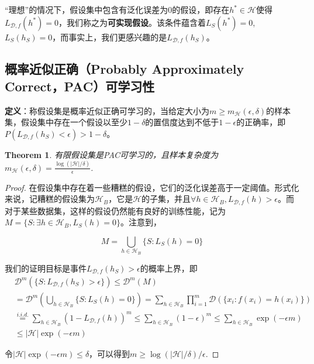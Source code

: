 \documentclass{article}
\newtheorem{theorem}{Theorem}
\newtheorem*{proof}{Proof}
\begin{document}
	“理想”的情况下，假设集中包含有泛化误差为0的假设，即存在$h^*\in\mathcal{H}$使得$L_{\mathcal{D},f}(h^*) = 0$，我们称之为\textbf{可实现假设}。该条件蕴含着$L_S(h^*)=0$, $L_S(h_S)=0$，而事实上，我们更感兴趣的是$L_{\mathcal{D},f}(h_S)$。

\subsection{概率近似正确（Probably Approximately Correct，PAC）可学习性}
\noindent\textbf{定义}：称假设集是概率近似正确可学习的，当给定大小为$m\geq m_\mathcal{H}(\epsilon,\delta)$的样本集，假设集中存在一个假设以至少$1-\delta$的置信度达到不低于$1-\epsilon$的正确率，即$P(L_{\mathcal{D},f}(h_S) < \epsilon) > 1-\delta$。
	
	\begin{theorem} 有限假设集是PAC可学习的，且样本复杂度为$m_\mathcal{H}(\epsilon,\delta)=\frac{\log(|\mathcal{H}|/\delta)}{\epsilon}$.
	\end{theorem}
	
	\begin{proof} 在假设集中存在着一些糟糕的假设，它们的泛化误差高于一定阈值。形式化来说，记糟糕的假设集为$\mathcal{H}_B$，它是$\mathcal{H}$的子集，并且$\forall h\in\mathcal{H}_B,L_{\mathcal{D},f}(h)>\epsilon$。而对于某些数据集，这样的假设仍然能有良好的训练性能，记为$M=\{S:\exists h\in \mathcal{H}_B, L_S(h)=0\}$。注意到，
	
	\begin{equation*}
	M=\bigcup\limits_{h\in\mathcal{H}_B}\{S:L_S(h)=0\}
	\end{equation*}
	
	我们的证明目标是事件$L_{\mathcal{D},f}(h_S)>\epsilon$的概率上界，即
	\begin{equation*}
	\begin{split}
	&\mathcal{D}^m(\{S:L_{\mathcal{D},f}(h_S)>\epsilon\})\leq\mathcal{D}^m(M) \\
	&=\mathcal{D}^m(\bigcup\limits_{h\in\mathcal{H}_B}\{S:L_S(h)=0\})         
	=\sum_{h\in\mathcal{H}_B}\prod_{i=1}^m\mathcal{D}(\{x_i:f(x_i)=h(x_i)\})  \\
	&\overset{i.i.d.}{=}\sum_{h\in\mathcal{H}_B}(1-L_{\mathcal{D},f}(h))^m   
	\leq\sum_{h\in\mathcal{H}_B}(1-\epsilon)^m\leq\sum_{h\in\mathcal{H}_B}\exp(-\epsilon m) \\
	&\leq|\mathcal{H}|\exp(-\epsilon m)
	\end{split}
	\end{equation*}

	令$|\mathcal{H}|\exp(-\epsilon m)\leq\delta$，可以得到$m\geq\log(|\mathcal{H}|/\delta)/\epsilon$.
	\end{proof}
\end{document}
